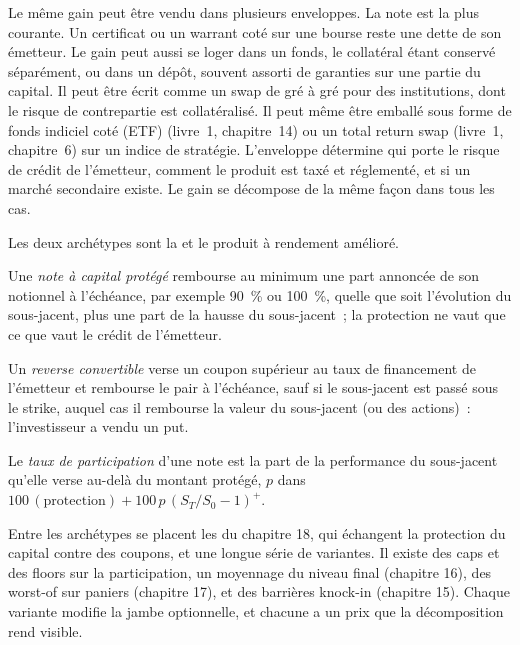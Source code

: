 Le même gain peut être vendu dans plusieurs enveloppes. La note est la plus courante. Un certificat ou un warrant coté sur une bourse
reste une dette de son émetteur. Le gain peut aussi se loger dans un fonds, le collatéral étant conservé séparément, ou dans un
dépôt, souvent assorti de garanties sur une partie du capital. Il peut être écrit comme un swap de gré à gré pour des institutions, dont
le risque de contrepartie est collatéralisé. Il peut même être emballé sous forme de fonds indiciel coté (ETF) (livre~1, chapitre~14) ou un
total return swap (livre~1, chapitre~6) sur un indice de stratégie. L'enveloppe détermine qui porte le risque de crédit de l'émetteur, comment
le produit est taxé et réglementé, et si un marché secondaire existe. Le gain se décompose de la même façon dans tous les cas.

Les deux archétypes sont la  et le produit à rendement amélioré.

\begin{definition}\label{def:dv:the-structured-products-business:protected}
Une \emph{note à capital protégé} rembourse au minimum une part annoncée de son notionnel à l'échéance,
par exemple 90~\% ou 100~\%, quelle que soit l'évolution du sous-jacent, plus une part de la hausse du sous-jacent~; la protection ne vaut que
ce que vaut le crédit de l'émetteur.
\end{definition}

\begin{definition}\label{def:dv:the-structured-products-business:rc}
Un \emph{reverse convertible} verse un coupon supérieur au taux de financement de l'émetteur et rembourse le pair à
l'échéance, sauf si le sous-jacent est passé sous le strike, auquel cas il rembourse la valeur du sous-jacent (ou des actions)~:
l'investisseur a vendu un put.
\end{definition}

\begin{definition}\label{def:dv:the-structured-products-business:participation}
Le \emph{taux de participation} d'une note est la part de la performance du sous-jacent qu'elle verse au-delà
du montant protégé, $p$ dans $100\,(\text{protection})+100\,p\,(S_T/S_0-1)^+$.
\end{definition}

Entre les archétypes se placent les  du chapitre 18, qui échangent la protection du capital contre des coupons, et une longue
série de variantes. Il existe des caps et des floors sur la participation, un moyennage du niveau final (chapitre 16), des worst-of sur paniers
(chapitre 17), et des barrières knock-in (chapitre 15). Chaque variante modifie la jambe optionnelle, et chacune a un prix que
la décomposition rend visible.

